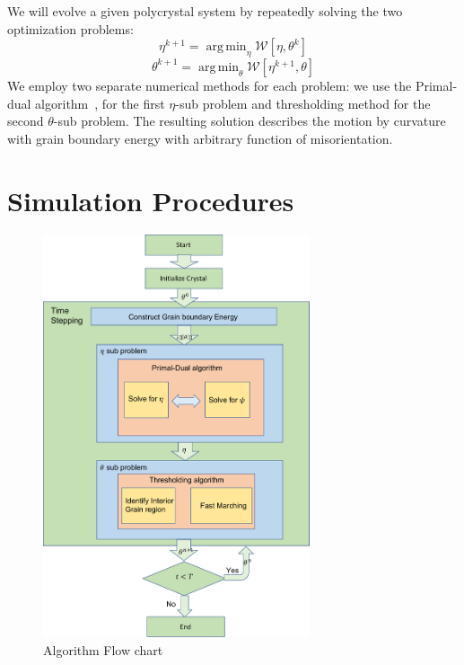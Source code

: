 \documentclass[11pt]{article}
\newcommand{\argmin}{\mathop{\mathrm{arg\,min}}}
\begin{document}
We will evolve a given polycrystal system
by repeatedly solving the two optimization problems:
\begin{equation}
\eta^{k+1}=\argmin_\eta \mathcal{W}[\eta, \theta^{k}] 
\label{eqn:eta_sub}
\end{equation}
\begin{equation}
\theta^{k+1}=\argmin_\theta  \mathcal{W}[\eta^{k+1}, \theta] 
\label{eqn:theta_sub}
\end{equation}
We employ two separate numerical methods for each problem:
we use the Primal-dual algorithm~\cite{Chambolle:2011,Jacobs:2019}, 
for the first $\eta$-sub problem and thresholding method for 
the second $\theta$-sub problem. 
The resulting solution describes the motion by curvature 
with grain boundary energy with arbitrary function of misorientation.

\section{Simulation Procedures}

\begin{figure}
\begin{center}
\includegraphics[width=0.7\textwidth]{Figures/flowChart.pdf}
\end{center}
\caption{Algorithm Flow chart}
\label{fig:flow_chart}
\end{figure}
\end{document}
